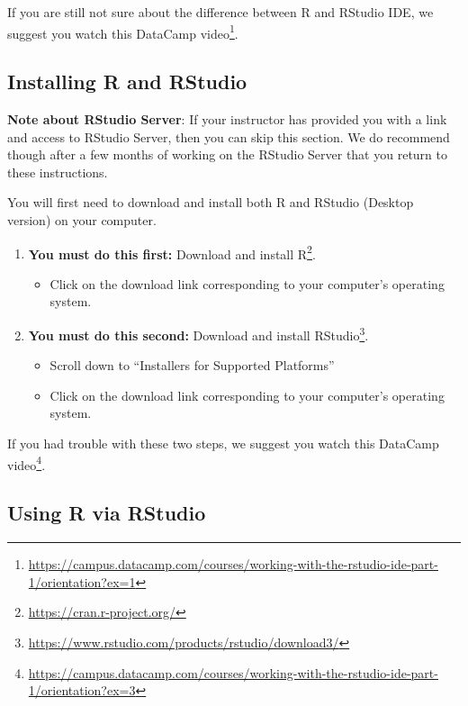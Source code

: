 \documentclass[12pt, krantz2,]{krantz}
\providecommand{\tightlist}{%
  \setlength{\itemsep}{0pt}\setlength{\parskip}{0pt}}
\renewenvironment{quote}{\begin{VF}}{\end{VF}}
\renewcommand{\href}[2]{#2\footnote{\url{#1}}}
\begin{document}
If you are still not sure about the difference between R and RStudio IDE, we suggest you watch this \href{https://campus.datacamp.com/courses/working-with-the-rstudio-ide-part-1/orientation?ex=1}{DataCamp video}.

\hypertarget{installing-r-and-rstudio}{%
\subsection{Installing R and RStudio}\label{installing-r-and-rstudio}}

\begin{quote}
\textbf{Note about RStudio Server}: If your instructor has provided you with a link and access to RStudio Server, then you can skip this section. We do recommend though after a few months of working on the RStudio Server that you return to these instructions.
\end{quote}

You will first need to download and install both R and RStudio (Desktop version) on your computer.

\begin{enumerate}
\def\labelenumi{\arabic{enumi}.}
\tightlist
\item
  \textbf{You must do this first:} \href{https://cran.r-project.org/}{Download and install R}.

  \begin{itemize}
  \tightlist
  \item
    Click on the download link corresponding to your computer's operating system.
  \end{itemize}
\item
  \textbf{You must do this second:} \href{https://www.rstudio.com/products/rstudio/download3/}{Download and install RStudio}.

  \begin{itemize}
  \tightlist
  \item
    Scroll down to ``Installers for Supported Platforms''
  \item
    Click on the download link corresponding to your computer's operating system.
  \end{itemize}
\end{enumerate}

If you had trouble with these two steps, we suggest you watch this \href{https://campus.datacamp.com/courses/working-with-the-rstudio-ide-part-1/orientation?ex=3}{DataCamp video}.

\hypertarget{using-r-via-rstudio}{%
\subsection{Using R via RStudio}\label{using-r-via-rstudio}}
\end{document}
